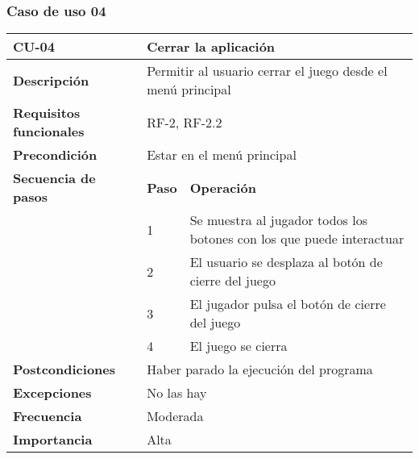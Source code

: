 \subsubsection{Caso de uso 04}
\begin{longtable}{lll}
\textbf{CU-04}                                   & \multicolumn{2}{l}{Cerrar la aplicación}                                              \\ \hline
\endfirsthead
%
\endhead
%
\textbf{Descripción}                             & \multicolumn{2}{l}{Permitir al usuario cerrar el juego desde el menú principal}       \\ \hline
\textbf{Requisitos funcionales}                  & \multicolumn{2}{l}{RF-2, RF-2.2}                                                      \\ \hline
\textbf{Precondición}                            & \multicolumn{2}{l}{Estar en el menú principal}                                        \\ \hline
\multicolumn{1}{l|}{\textbf{Secuencia de pasos}} & \textbf{Paso} & \textbf{Operación}                                                    \\ \cline{2-3} 
\multicolumn{1}{l|}{}                            & 1             & Se muestra al jugador todos los botones con los que puede interactuar \\
\multicolumn{1}{l|}{}                            & 2             & El usuario se desplaza al botón de cierre del juego                   \\
\multicolumn{1}{l|}{}                            & 3             & El jugador pulsa el botón de cierre del juego                         \\
\multicolumn{1}{l|}{}                            & 4             & El juego se cierra                                                    \\ \hline
\textbf{Postcondiciones}                         & \multicolumn{2}{l}{Haber parado la ejecución del programa}                            \\ \hline
\textbf{Excepciones}                             & \multicolumn{2}{l}{No las hay}                                                        \\ \hline
\textbf{Frecuencia}                              & \multicolumn{2}{l}{Moderada}                                                          \\ \hline
\textbf{Importancia}                             & \multicolumn{2}{l}{Alta}                                                              \\ \hline
\end{longtable}

